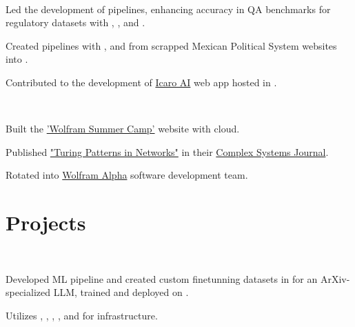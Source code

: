 \documentclass[]{tex/deedy-resume-openfont}
\begin{document}
\begin{minipage}[t]{0.67\textwidth}
\\
\begin{tightemize}
    \item Led the development of  pipelines, enhancing accuracy in QA benchmarks for regulatory datasets with , , and .
    \item Created  pipelines with ,  and  from scrapped Mexican Political System websites into .
    \item Contributed to the  development of \href{http://www.icaro.ai/home/}{Icaro AI} web app hosted in .
\end{tightemize}
\sectionsep

\\
\begin{tightemize}
    \item Built the \href{https://education.wolfram.com/summer-camp/}{'Wolfram Summer Camp'} website with \href{https://www.wolfram.com/wolfram-one/}{} cloud.
    \item Published \href{https://www.complex-systems.com/abstracts/v32_i03_a02/}{"Turing Patterns in Networks"} in their \href{https://www.complex-systems.com/}{Complex Systems Journal}.
    \item Rotated into \href{https://www.wolframalpha.com/}{Wolfram Alpha} software development team. 
\end{tightemize}
\sectionsep


\section{Projects}

\\
\begin{tightemize}
    \item Developed ML pipeline and created custom finetunning datasets in  for an ArXiv-specialized LLM, trained and deployed on .
    \item Utilizes , , , ,  and  for infrastructure.
\end{tightemize}
\sectionsep


\end{minipage}
\end{document}
